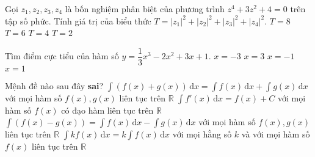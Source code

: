 \begin{ex}%
	Gọi $z_1,z_2,z_3,z_4$ là bốn nghiệm phân biệt của phương trình $z^4+3z^2+4=0$ trên tập số phức. Tính giá trị của biểu thức $T=|z_1|^2+|z_2|^2+|z_3|^2+|z_4|^2$.
	\choice
	{\True $T=8$}
	{$T=6$}
	{$T=4$}
	{$T=2$}
\end{ex}

\begin{ex}%
	Tìm điểm cực tiểu của hàm số $y=\dfrac{1}{3}x^3-2x^2+3x+1$.
	\choice
	{$x=-3$}
	{\True $x=3$}
	{$x=-1$}
	{$x=1$}
\end{ex}

\begin{ex}%
	Mệnh đề nào sau đây \textbf{sai}?
	\choice
	{$\displaystyle \int \left( f(x)+g(x) \right)\mathrm{\,d}x=\int f(x)\mathrm{\,d}x +\int g(x)\mathrm{\,d}x$ với mọi hàm số $f(x),g(x)$ liên tục trên $\mathbb{R}$}
	{$\displaystyle \int  f'(x)\mathrm{\,d}x=f(x)+C$ với mọi hàm số $f(x)$ có đạo hàm liên tục trên $\mathbb{R}$}
	{$\displaystyle \int \left( f(x)-g(x) \right)=\int f(x)\mathrm{\,d}x -\int g(x)\mathrm{\,d}x$ với mọi hàm số $f(x),g(x)$ liên tục trên $\mathbb{R}$}
	{\True $\displaystyle \int kf(x)\mathrm{\,d}x=k \int f(x)\mathrm{\,d}x$ với mọi hằng số $k$ và với mọi hàm số $f(x)$ liên tục trên $\mathbb{R}$}
\end{ex}

